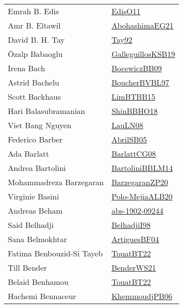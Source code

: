 {\begin{longtable}{p{4cm}p{20cm}}
Emrah B. Edis & \href{papers/EdisO11.pdf}{EdisO11}\cite{EdisO11} \\
Amr B. Eltawil & \href{articles/AbohashimaEG21.pdf}{AbohashimaEG21}\cite{AbohashimaEG21} \\
David B. H. Tay & \href{articles/Tay92.pdf}{Tay92}\cite{Tay92} \\
{\"{O}}zalp Babaoglu & \href{papers/GalleguillosKSB19.pdf}{GalleguillosKSB19}\cite{GalleguillosKSB19} \\
Irena Bach & \href{articles/BocewiczBB09.pdf}{BocewiczBB09}\cite{BocewiczBB09} \\
Astrid Bachelu & \href{papers/BoucherBVBL97.pdf}{BoucherBVBL97}\cite{BoucherBVBL97} \\
Scott Backhaus & \href{papers/LimBTBB15.pdf}{LimBTBB15}\cite{LimBTBB15} \\
Hari Balasubramanian & \href{articles/ShinBBHO18.pdf}{ShinBBHO18}\cite{ShinBBHO18} \\
Viet Bang Nguyen & \href{papers/LauLN08.pdf}{LauLN08}\cite{LauLN08} \\
Federico Barber & \href{papers/AbrilSB05.pdf}{AbrilSB05}\cite{AbrilSB05} \\
Ada Barlatt & \href{papers/BarlattCG08.pdf}{BarlattCG08}\cite{BarlattCG08} \\
Andrea Bartolini & \href{papers/BartoliniBBLM14.pdf}{BartoliniBBLM14}\cite{BartoliniBBLM14} \\
Mohammadreza Barzegaran & \href{papers/BarzegaranZP20.pdf}{BarzegaranZP20}\cite{BarzegaranZP20} \\
Virginie Basini & \href{articles/Polo-MejiaALB20.pdf}{Polo-MejiaALB20}\cite{Polo-MejiaALB20} \\
Andreas Beham & \href{articles/abs-1902-09244.pdf}{abs-1902-09244}\cite{abs-1902-09244} \\
Said Belhadji & \href{articles/BelhadjiI98.pdf}{BelhadjiI98}\cite{BelhadjiI98} \\
Sana Belmokhtar & \href{papers/ArtiguesBF04.pdf}{ArtiguesBF04}\cite{ArtiguesBF04} \\
Fatima Benbouzid{-}Si Tayeb & \href{papers/TouatBT22.pdf}{TouatBT22}\cite{TouatBT22} \\
Till Bender & \href{papers/BenderWS21.pdf}{BenderWS21}\cite{BenderWS21} \\
Belaid Benhamou & \href{papers/TouatBT22.pdf}{TouatBT22}\cite{TouatBT22} \\
Hachemi Bennaceur & \href{papers/KhemmoudjPB06.pdf}{KhemmoudjPB06}\cite{KhemmoudjPB06} \\

\end{longtable}}

